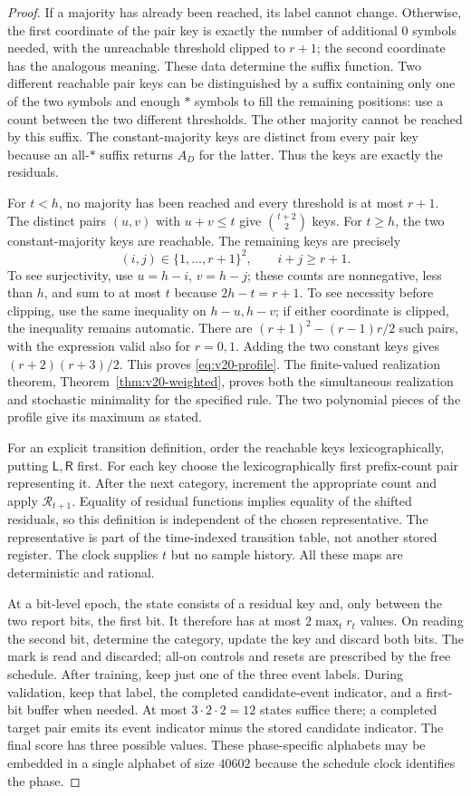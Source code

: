 \begin{proof}
If a majority has already been reached, its label cannot change. Otherwise,
the first coordinate of the pair key is exactly the number of additional
$0$ symbols needed, with the unreachable threshold clipped to $r+1$;
the second coordinate has the analogous meaning. These data determine
the suffix function. Two different reachable pair keys can be distinguished
by a suffix containing only one of the two symbols and enough $*$ symbols
to fill the remaining positions: use a count between the two different
thresholds. The other majority cannot be reached by this suffix. The
constant-majority keys are distinct from every pair key because an all-$*$
suffix returns $A_D$ for the latter. Thus the keys are exactly the
residuals.

For $t<h$, no majority has been reached and every threshold is at most
$r+1$. The distinct pairs $(u,v)$ with $u+v\le t$ give
$\binom{t+2}{2}$ keys. For $t\ge h$, the two constant-majority keys
are reachable. The remaining keys are precisely
\[
 (i,j)\in\{1,\ldots,r+1\}^2,\qquad i+j\ge r+1.
\]
To see surjectivity, use $u=h-i$, $v=h-j$; these counts are nonnegative,
less than $h$, and sum to at most $t$ because $2h-t=r+1$.
To see necessity before clipping, use the same inequality on $h-u,h-v$;
if either coordinate is clipped, the inequality remains automatic.
There are
$(r+1)^2-(r-1)r/2$ such pairs, with the expression valid also for
$r=0,1$. Adding the two constant keys gives
$(r+2)(r+3)/2$. This proves \eqref{eq:v20-profile}. The finite-valued
realization theorem, Theorem~\ref{thm:v20-weighted}, proves both the
simultaneous realization and stochastic minimality for the specified rule.
The two polynomial pieces of the profile give its maximum as stated.

For an explicit transition definition, order the reachable keys
lexicographically, putting $\mathsf L,\mathsf R$ first. For each key
choose the lexicographically first prefix-count pair representing it.
After the next category, increment the appropriate count and apply
$\mathcal R_{t+1}$. Equality of residual functions implies equality of
the shifted residuals, so this definition is independent of the chosen
representative. The representative is part of the time-indexed transition
table, not another stored register. The clock supplies $t$ but no sample
history. All these maps are deterministic and rational.

At a bit-level epoch, the state consists of a residual key and, only
between the two report bits, the first bit. It therefore has at most
$2\max_t r_t$ values. On reading the second bit, determine the category,
update the key and discard both bits. The mark is read and discarded;
all-on controls and resets are prescribed by the free schedule. After
training, keep just one of the three event labels. During validation,
keep that label, the completed candidate-event indicator, and a first-bit
buffer when needed. At most $3\cdot2\cdot2=12$ states suffice there;
a completed target pair emits its event indicator minus the stored
candidate indicator. The final score has three possible values. These
phase-specific alphabets may be embedded in a single alphabet of size
$40602$ because the schedule clock identifies the phase.


\end{proof}
